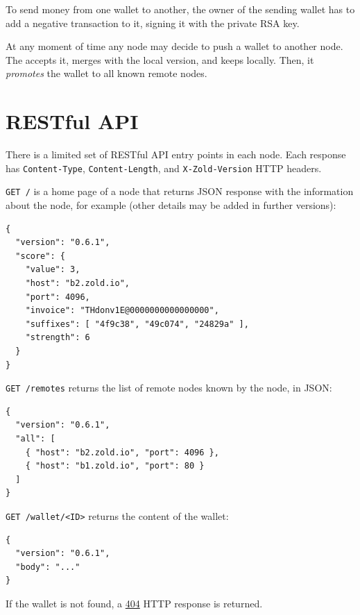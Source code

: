 \documentclass[11pt,oneside]{article}
\newcommand\dd[1]{\colorbox{gray!30}{\texttt{#1}}}
\begin{document}
To send money from one wallet to another, the owner of the sending wallet
has to add a negative transaction to it, signing it with the private RSA key.

At any moment of time any node may decide to push a wallet to another node.
The accepts it, merges with the local version, and keeps locally. Then, it
\emph{promotes} the wallet to all known remote nodes.

\section{RESTful API}

There is a limited set of RESTful API entry points in each node.
Each response has \dd{Content-Type},
\dd{Content-Length}, and \dd{X-Zold-Version}
HTTP headers.

\dd{GET /} is a home page of a node that returns JSON response with the
information about the node, for example (other details may be added in
further versions):

\begin{verbatim}
{
  "version": "0.6.1",
  "score": {
    "value": 3,
    "host": "b2.zold.io",
    "port": 4096,
    "invoice": "THdonv1E@0000000000000000",
    "suffixes": [ "4f9c38", "49c074", "24829a" ],
    "strength": 6
  }
}
\end{verbatim}

\dd{GET /remotes} returns the list of remote nodes known by the node, in JSON:

\begin{verbatim}
{
  "version": "0.6.1",
  "all": [
    { "host": "b2.zold.io", "port": 4096 },
    { "host": "b1.zold.io", "port": 80 }
  ]
}\end{verbatim}

\dd{GET /wallet/<ID>} returns the content of the wallet:

\begin{verbatim}
{
  "version": "0.6.1",
  "body": "..."
}\end{verbatim}

If the wallet is not found, a
\href{https://www.w3.org/Protocols/rfc2616/rfc2616-sec10.html#sec10.4.5}{404}
HTTP response is returned.
\end{document}
